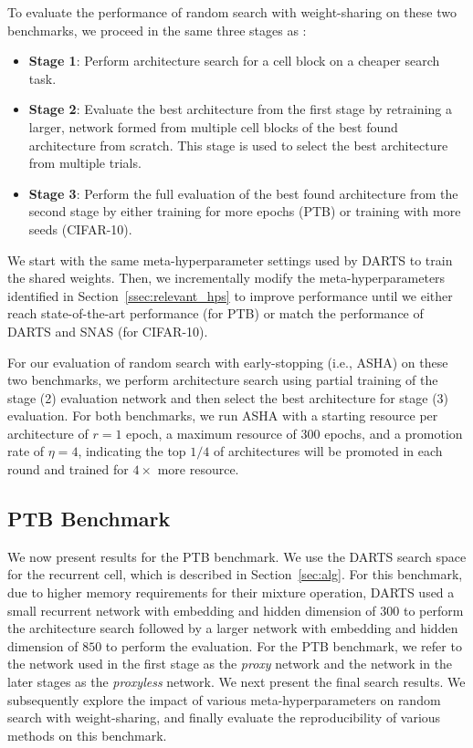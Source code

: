 \documentclass[acmlarge, nonacm]{acmart}
\begin{document}
To evaluate the performance of random search with weight-sharing on these two benchmarks, we proceed in the same three stages as \citet{liu2018darts}:
\begin{itemize}
    \item \textbf{Stage 1}: Perform architecture search for a cell block on a cheaper search task.  
    \item \textbf{Stage 2}: Evaluate the best architecture from the first stage by retraining a larger, network formed from multiple cell blocks of the best found architecture from scratch.  This stage is used to select the best architecture from multiple trials.
    \item \textbf{Stage 3}: Perform the full evaluation of the best found architecture from the second stage by either training for more epochs (PTB) or training with more seeds (CIFAR-10).  
\end{itemize}
We start with the same meta-hyperparameter settings used by DARTS to train the shared weights.  Then, we incrementally modify the meta-hyperparameters identified in Section~\ref{ssec:relevant_hps} to improve performance until we either reach state-of-the-art performance (for PTB) or match the performance of DARTS and SNAS (for CIFAR-10).  

For our evaluation of random search with early-stopping (i.e., ASHA) on these two benchmarks, we perform architecture search using partial training of the stage (2) evaluation network and then select the best architecture for stage (3) evaluation.  For both benchmarks, we run ASHA with a starting resource per architecture of $r=1$ epoch, a maximum resource of $300$ epochs, and a promotion rate of $\eta=4$, indicating the top $1/4$ of architectures will be promoted in each round and trained for $4\times$ more resource. 

\subsection{PTB Benchmark}
\label{ssec:rnn}
We now present results for the PTB benchmark.  
We use the DARTS search space for the recurrent cell, which is described in Section~\ref{sec:alg}.  For this benchmark, 
due to higher memory requirements for their mixture operation, DARTS used a small recurrent network with embedding and hidden dimension of 300 to perform the architecture search followed by a larger network with embedding and hidden dimension of $850$ to perform the evaluation.  For the PTB benchmark, we refer to the network used in the first stage as the \emph{proxy} network and the network in the later stages as the \emph{proxyless} network.  
 We next present the final search results. We subsequently explore the impact of various meta-hyperparameters on random search with weight-sharing, and finally evaluate the reproducibility of various methods on this benchmark.
\end{document}
